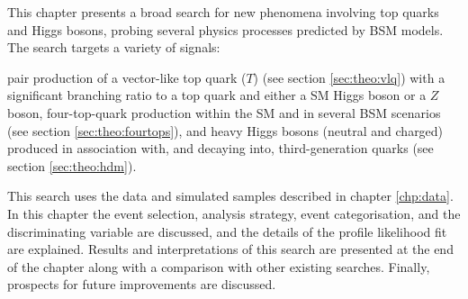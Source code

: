 
This chapter presents a broad search for new phenomena involving top quarks and Higgs bosons, probing several physics processes predicted by BSM models. The search targets a variety of signals:

\bi
\ib pair production of a vector-like top quark ($T$) (see section \ref{sec:theo:vlq}) with a significant branching ratio to a top quark and either a SM Higgs boson or a $Z$ boson,
\ib four-top-quark production within the SM and in several BSM scenarios (see section \ref{sec:theo:fourtops}), and
\ib heavy Higgs bosons (neutral and charged) produced in association with, and decaying into, third-generation quarks (see section \ref{sec:theo:hdm}).
\ei 

This search uses the data and simulated samples described in chapter \ref{chp:data}. In this chapter the event selection, analysis strategy, event categorisation, and the discriminating variable are discussed, and the details of the profile likelihood fit are explained. Results and interpretations of this search are presented at the end of the chapter along with a comparison with other existing searches. Finally, prospects for future improvements are discussed.